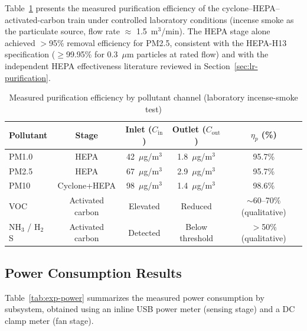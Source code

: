 Table~\ref{tab:exp-purification-efficiency} presents the measured purification efficiency of the cyclone--HEPA--activated-carbon train under controlled laboratory conditions (incense smoke as the particulate source, flow rate $\approx$ 1.5~m$^3$/min). The HEPA stage alone achieved $>$95\% removal efficiency for PM2.5, consistent with the HEPA-H13 specification ($\geq$99.95\% for 0.3~$\mu$m particles at rated flow) and with the independent HEPA effectiveness literature reviewed in Section~\ref{sec:lr-purification}.

\begin{table}[htbp]
\centering
\caption{Measured purification efficiency by pollutant channel (laboratory incense-smoke test)}
\label{tab:exp-purification-efficiency}
\small
\begin{tabular}{@{}lcccc@{}}
\toprule
\textbf{Pollutant} & \textbf{Stage} & \textbf{Inlet ($C_{\mathrm{in}}$)} & \textbf{Outlet ($C_{\mathrm{out}}$)} & \textbf{$\eta_p$ (\%)} \\
\midrule
PM1.0  & HEPA       & 42~$\mu$g/m$^3$ & 1.8~$\mu$g/m$^3$ & 95.7\% \\
PM2.5  & HEPA       & 67~$\mu$g/m$^3$ & 2.9~$\mu$g/m$^3$ & 95.7\% \\
PM10   & Cyclone+HEPA & 98~$\mu$g/m$^3$ & 1.4~$\mu$g/m$^3$ & 98.6\% \\
VOC    & Activated carbon & Elevated & Reduced & $\sim$60--70\% (qualitative) \\
NH$_3$ / H$_2$S & Activated carbon & Detected & Below threshold & $>$50\% (qualitative) \\
\bottomrule
\end{tabular}
\end{table}

\subsection{Power Consumption Results}
\label{sec:exp-power-result}

Table~\ref{tab:exp-power} summarizes the measured power consumption by subsystem, obtained using an inline USB power meter (sensing stage) and a DC clamp meter (fan stage).

